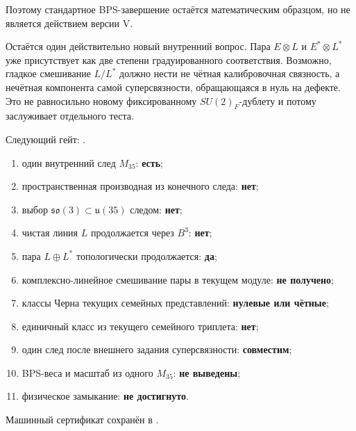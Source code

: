 Поэтому стандартное BPS-завершение остаётся математическим образцом, но
не является действием версии V.

Остаётся один действительно новый внутренний вопрос. Пара
$E\otimes L$ и $E^*\otimes L^*$ уже присутствует как две степени
градуированного соответствия. Возможно, гладкое смешивание $L/L^*$ должно
нести не чётная калибровочная связность, а нечётная компонента самой
суперсвязности, обращающаяся в нуль на дефекте. Это не равносильно новому
фиксированному $SU(2)_F$-дублету и потому заслуживает отдельного теста.

Следующий гейт:
.

\begin{protocol}
\begin{enumerate}
 \item один внутренний след $M_{35}$: \textbf{есть};
 \item пространственная производная из конечного следа: \textbf{нет};
 \item выбор $\mathfrak{so}(3)\subset\mathfrak u(35)$ следом:
 \textbf{нет};
 \item чистая линия $L$ продолжается через $B^3$: \textbf{нет};
 \item пара $L\oplus L^*$ топологически продолжается: \textbf{да};
 \item комплексно-линейное смешивание пары в текущем модуле:
 \textbf{не получено};
 \item классы Черна текущих семейных представлений:
 \textbf{нулевые или чётные};
 \item единичный класс из текущего семейного триплета: \textbf{нет};
 \item один след после внешнего задания суперсвязности:
 \textbf{совместим};
 \item BPS-веса и масштаб из одного $M_{35}$: \textbf{не выведены};
 \item физическое замыкание: \textbf{не достигнуто}.
\end{enumerate}
\end{protocol}

Машинный сертификат сохранён в
.
